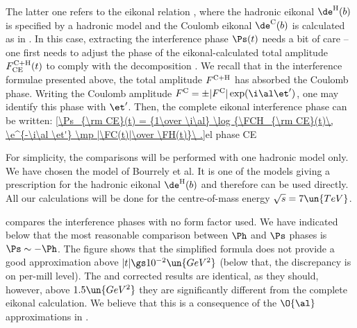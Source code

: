 \noindent The latter one refers to the eikonal relation , where the hadronic eikonal $\de^{\rm H}(b)$ is specified by a hadronic model and the Coulomb eikonal $\de^{\rm C}(b)$ is calculated as in . In this case, extracting the interference phase $\Ps(t)$ needs a bit of care -- one first needs to adjust the phase of the eikonal-calculated total amplitude $F^{\rm C+H}_{\rm CE}(t)$ to comply with the decomposition . We recall that in the interference formulae presented above, the total amplitude $F^{\rm C+H}$ has absorbed the Coulomb phase. Writing the Coulomb amplitude $\FC = \pm |\FC| \exp(\i\al\et')$, one may identify this phase with $\et'$. Then, the complete eikonal interference phase can be written:
\eqref{\Ps_{\rm CE}(t) = {1\over \i\al} \log {\FCH_{\rm CE}(t)\, \e^{-\i\al \et'} \mp |\FC(t)|\over \FH(t)}\ .}{el phase CE}

For simplicity, the comparisons will be performed with one hadronic model only. We have chosen the model of Bourrely et al. It is one of the models giving a prescription for the hadronic eikonal $\de^{\rm H}(b)$ and therefore  can be used directly. All our calculations will be done for the centre-of-mass energy $\sqrt s = 7\un{TeV}$.


 compares the interference phases with no form factor used. We have indicated below  that the most reasonable comparison between $\Ph$ and $\Ps$ phases is $\Ps \sim - \Ph$. The figure shows that the simplified \WY{} formula does not provide a good approximation above $|t| \gs 10^{-2}\un{GeV^2}$ (below that, the discrepancy is on per-mill level). The \WY{} and corrected \KL{} results are identical, as they should, however, above $1.5\un{GeV^2}$ they are significantly different from the complete eikonal calculation. We believe that this is a consequence of the $\O{\al}$ approximations in .






